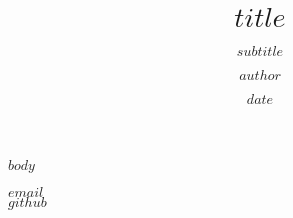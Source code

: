 \documentclass{beamer}
\title{$title$}
\subtitle{$subtitle$}
\author{$author$}
\institute{@$university$}
\date{$date$}
\begin{document}
\begin{frame}
  \titlepage
\end{frame}

$body$

\begin{frame}[plain]
\begin{center}
  \faEnvelope \hspace{0.2cm} $email$\\
  \vspace{0.5cm}
  \faGithub \hspace{0.2cm} \href{$github$}{$github$}
\end{center}
\end{frame}
\end{document}
